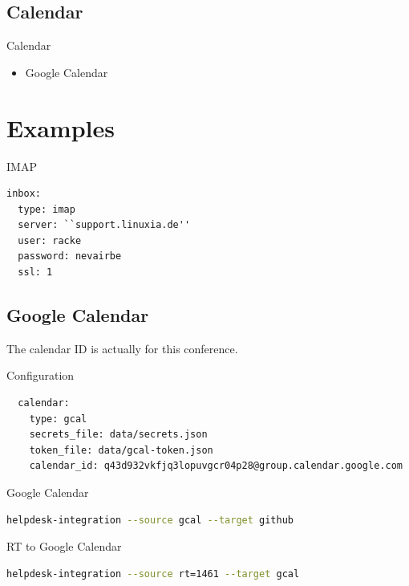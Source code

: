 \subsection{Calendar}
\begin{frame}{Calendar}
\begin{itemize}
\item Google Calendar
\end{itemize}
\end{frame}

\section{Examples}

\begin{frame}[fragile]{IMAP}
\begin{lstlisting}
inbox:
  type: imap
  server: ``support.linuxia.de''
  user: racke
  password: nevairbe
  ssl: 1
\end{lstlisting}
\end{frame}

\subsection{Google Calendar}

The calendar ID is actually for this conference.

\begin{frame}[fragile]{Configuration}
\begin{lstlisting}
  calendar:
    type: gcal
    secrets_file: data/secrets.json
    token_file: data/gcal-token.json
    calendar_id: q43d932vkfjq3lopuvgcr04p28@group.calendar.google.com
\end{lstlisting}
\end{frame}

\begin{frame}[fragile]{Google Calendar}
\begin{lstlisting}[language=bash]
helpdesk-integration --source gcal --target github
\end{lstlisting}
\end{frame}

\begin{frame}[fragile]{RT to Google Calendar}
\begin{lstlisting}[language=bash]
helpdesk-integration --source rt=1461 --target gcal
\end{lstlisting}
\end{frame}

